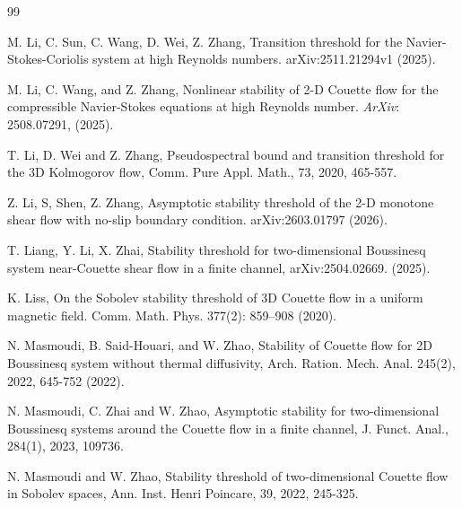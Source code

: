 \documentclass[12pt]{article}
\numberwithin{equation}{section}
\begin{document}
\begin{thebibliography}{99}
  		
  		M. Li, C. Sun, C. Wang, D. Wei, Z. Zhang, Transition threshold for the Navier-Stokes-Coriolis system at high Reynolds numbers. arXiv:2511.21294v1 (2025).
  		
  		
  		 M. Li, C. Wang, and Z. Zhang, Nonlinear stability of 2-D Couette flow for the compressible Navier-Stokes equations at high Reynolds number.   \textit{ArXiv}: 2508.07291, (2025). 
  		
  		
  		 T. Li, D. Wei and Z. Zhang, Pseudospectral bound and transition threshold for the 3D Kolmogorov flow, Comm. Pure Appl. Math., 73, 2020, 465-557.  		
  		
  		 Z. Li, S, Shen, Z. Zhang, Asymptotic stability threshold of the 2-D monotone shear flow with no-slip boundary condition. arXiv:2603.01797 (2026).


        T. Liang, Y. Li, X. Zhai, Stability threshold for two-dimensional Boussinesq system near-Couette shear flow in a finite channel, arXiv:2504.02669. (2025).
        
  		K. Liss, On the Sobolev stability threshold of 3D Couette flow in a uniform magnetic field. Comm. Math. Phys. 377(2): 859–908 (2020).
  		
  		 N. Masmoudi, B. Said-Houari, and W. Zhao, Stability of Couette flow for 2D Boussinesq system without thermal diffusivity, Arch. Ration. Mech. Anal.   245(2), 2022, 645-752 (2022).
  		
  		 N. Masmoudi, C. Zhai and W. Zhao, Asymptotic stability for two-dimensional Boussinesq systems around the Couette flow in a finite channel, J. Funct. Anal., 284(1), 2023, 109736.
  		
  		 N. Masmoudi and W. Zhao, Stability threshold of two-dimensional Couette flow in Sobolev spaces, Ann. Inst. Henri Poincare, 39, 2022, 245-325.
  		
  		
  		

\end{thebibliography}
\end{document}
